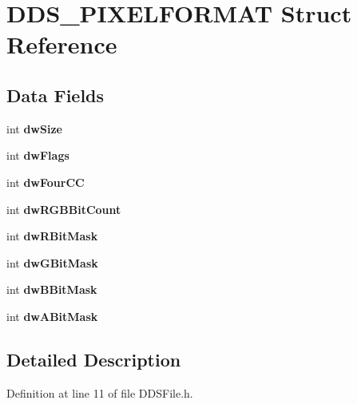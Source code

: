 \hypertarget{struct_d_d_s___p_i_x_e_l_f_o_r_m_a_t}{}\section{D\+D\+S\+\_\+\+P\+I\+X\+E\+L\+F\+O\+R\+M\+AT Struct Reference}
\label{struct_d_d_s___p_i_x_e_l_f_o_r_m_a_t}
\subsection*{Data Fields}
\begin{DoxyCompactItemize}
\item 
int {\bfseries dw\+Size}\hypertarget{struct_d_d_s___p_i_x_e_l_f_o_r_m_a_t_a739655da318fe79bae54f19b04f3f8c5}{}\label{struct_d_d_s___p_i_x_e_l_f_o_r_m_a_t_a739655da318fe79bae54f19b04f3f8c5}

\item 
int {\bfseries dw\+Flags}\hypertarget{struct_d_d_s___p_i_x_e_l_f_o_r_m_a_t_ae92e157af09b1b4e635637ac33031ec8}{}\label{struct_d_d_s___p_i_x_e_l_f_o_r_m_a_t_ae92e157af09b1b4e635637ac33031ec8}

\item 
int {\bfseries dw\+Four\+CC}\hypertarget{struct_d_d_s___p_i_x_e_l_f_o_r_m_a_t_ab180a1787fcf6a6f6aec7179b9ac9b67}{}\label{struct_d_d_s___p_i_x_e_l_f_o_r_m_a_t_ab180a1787fcf6a6f6aec7179b9ac9b67}

\item 
int {\bfseries dw\+R\+G\+B\+Bit\+Count}\hypertarget{struct_d_d_s___p_i_x_e_l_f_o_r_m_a_t_ab419a113c34099904af5aaf09c243bcb}{}\label{struct_d_d_s___p_i_x_e_l_f_o_r_m_a_t_ab419a113c34099904af5aaf09c243bcb}

\item 
int {\bfseries dw\+R\+Bit\+Mask}\hypertarget{struct_d_d_s___p_i_x_e_l_f_o_r_m_a_t_a0badef2982a2b348111131b8a8464a3a}{}\label{struct_d_d_s___p_i_x_e_l_f_o_r_m_a_t_a0badef2982a2b348111131b8a8464a3a}

\item 
int {\bfseries dw\+G\+Bit\+Mask}\hypertarget{struct_d_d_s___p_i_x_e_l_f_o_r_m_a_t_aa63c6570e96e5e2bd01c661f0ee39030}{}\label{struct_d_d_s___p_i_x_e_l_f_o_r_m_a_t_aa63c6570e96e5e2bd01c661f0ee39030}

\item 
int {\bfseries dw\+B\+Bit\+Mask}\hypertarget{struct_d_d_s___p_i_x_e_l_f_o_r_m_a_t_a22cc6451146f3f6774654ee8c8fc72f5}{}\label{struct_d_d_s___p_i_x_e_l_f_o_r_m_a_t_a22cc6451146f3f6774654ee8c8fc72f5}

\item 
int {\bfseries dw\+A\+Bit\+Mask}\hypertarget{struct_d_d_s___p_i_x_e_l_f_o_r_m_a_t_ae08eb1a76181a3b3fabf65590c101b8c}{}\label{struct_d_d_s___p_i_x_e_l_f_o_r_m_a_t_ae08eb1a76181a3b3fabf65590c101b8c}

\end{DoxyCompactItemize}


\subsection{Detailed Description}


Definition at line 11 of file D\+D\+S\+File.\+h.

